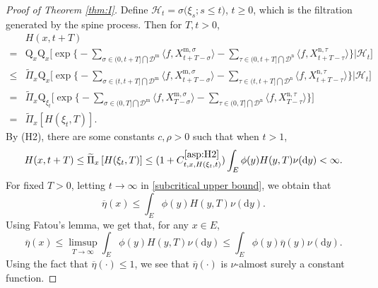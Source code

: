 \documentclass[12pt,a4paper]{amsart}
\numberwithin{equation}{section}
\theoremstyle{plain}
\theoremstyle{definition}
\theoremstyle{remark}
\begin{document}
\begin{proof}[Proof of Theorem \ref{thm:I}]
Define  $\mathcal{H}_t=\sigma\big(\xi_s; s\leq t\big)$, $t\geq 0$, which is  the filtration generated by the spine process.  Then for $T,t>0$,
\begin{equation}\label{subcritical upper bound}
 \begin{aligned}
 &H(x,t+T)\\
 =&\mathrm Q_{x}\mathrm Q_{x}\Big[\exp\Big\{-\sum_{\sigma\in (0, t+T]\bigcap \mathcal D^{\mathrm m}}\langle f, X_{t+T-\sigma}^{{\mathrm m},\sigma}\rangle -\sum_{\tau\in (0, t+T]\bigcap \mathcal D^{\mathrm n}}\langle f, X_{t+T-\tau}^{{\mathrm n}, \tau}\rangle \Big\}\Big| \mathcal H_t\Big]\\
 \leq&\widetilde\Pi_x\mathrm Q_{x}\Big[\exp\Big\{-\sum_{\sigma\in (t, t+T]\bigcap \mathcal D^{\mathrm m}}\langle f, X_{t+T-\sigma}^{{\mathrm m},\sigma}\rangle -\sum_{\tau\in (t, t+T]\bigcap \mathcal D^{\mathrm n}}\langle f, X_{t+T-\tau}^{{\mathrm n}, \tau}\rangle \Big\}\Big| \mathcal H_t\Big]\\
 =&
   \widetilde\Pi_x\mathrm Q_{\xi_t}\Big[\exp\Big\{-\sum_{\sigma\in (0, T]\bigcap \mathcal D^{\mathrm m}}\langle f, X_{T-\sigma}^{{\mathrm m},\sigma}\rangle -\sum_{\tau\in (0, T]\bigcap \mathcal D^{\mathrm n}}\langle f, X_{T-\tau}^{{\mathrm n}, \tau}\rangle \Big\}\Big]\\
 =&\widetilde\Pi_x\left[ H(\xi_t, T)\right].
 \end{aligned}
 \end{equation}
By (H2), there are some constants $c,\rho>0$ such that when $t>1$,
\[
 H(x,t+T)\leq \widetilde\Pi_x\left[ H(\xi_t, T)\right]\leq 
 (1+C^{\eqref{asp:H2}}_{t, x, H(\xi_t, t)})\int_E\phi(y)H(y,T)\nu(\mathrm dy)<\infty.
 \]
For fixed  $T>0$, letting $t\to \infty$ in \eqref{subcritical upper bound}, we obtain that
\begin{equation}\label{sub super}
\overline\eta(x)\leq \int_E\phi(y)H(y,T)\nu(\mathrm dy).
\end{equation}
   Using Fatou's lemma, we get that, for any $x\in E$,
\begin{equation}\label{sup inequality}
\overline\eta(x)\leq
\limsup_{T\rightarrow\infty}\int_E\phi(y)H(y,T)\nu(\mathrm dy)
\leq \int_E\phi(y)\overline{\eta}(y)\nu(\mathrm dy).
\end{equation}
Using the fact that  $\overline{\eta}(\cdot)\leq 1$, 
we see that $\overline\eta(\cdot)$ is $\nu$-almost surely a constant function.


\end{proof}
\end{document}

